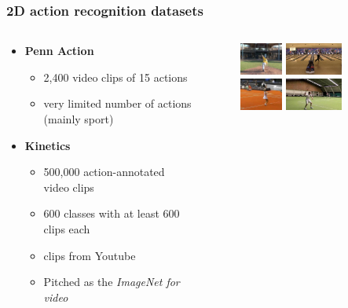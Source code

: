 \documentclass[9pt]{beamer}
\newenvironment{myframe}[1][]{%
\begin{frame}%
\frametitle{#1}
\setcounter{footnote}{0}


}{%
\end{frame}%
}
\begin{document}
\begin{myframe}[2D action recognition datasets]
  \begin{columns}[T]
      \begin{column}{.48\textwidth}
          \vspace{20px}
          \begin{itemize}
              \item \textbf{Penn Action\footnotemark}
              \begin{itemize}
                  \item 2,400 video clips of 15 actions
                  \item very limited number of actions (mainly sport)
              \end{itemize}
              \vspace{40px}
              \item \textbf{Kinetics \footnotemark}
              \begin{itemize}
                  \item 500,000 action-annotated video clips
                  \item 600 classes with at least 600 clips each
                  \item clips from Youtube
                  \item Pitched as the \textit{ImageNet for video}
              \end{itemize}
          \end{itemize}
      \end{column}
      \begin{column}{.48\textwidth}
          \begin{figure}
              \includegraphics[height=40px]{pa-01.jpg}
              \includegraphics[height=40px]{pa-02.jpg}
              \includegraphics[height=40px]{pa-03.jpg}
              \includegraphics[height=40px]{pa-04.jpg}

\end{figure}
\end{column}
\end{columns}
\end{myframe}
\end{document}
